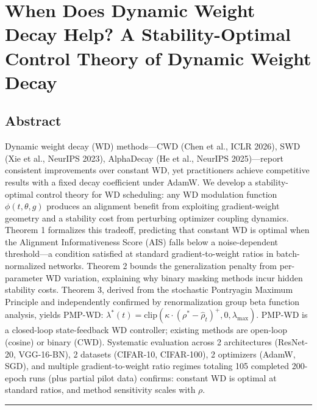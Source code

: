 \documentclass[
]{article}
\author{}
\date{}
\begin{document}
\hypertarget{when-does-dynamic-weight-decay-help-a-stability-optimal-control-theory-of-dynamic-weight-decay}{%
\section{When Does Dynamic Weight Decay Help? A Stability-Optimal
Control Theory of Dynamic Weight
Decay}\label{when-does-dynamic-weight-decay-help-a-stability-optimal-control-theory-of-dynamic-weight-decay}}

\hypertarget{abstract}{%
\subsection{Abstract}\label{abstract}}

Dynamic weight decay (WD) methods---CWD (Chen et al., ICLR 2026), SWD
(Xie et al., NeurIPS 2023), AlphaDecay (He et al., NeurIPS
2025)---report consistent improvements over constant WD, yet
practitioners achieve competitive results with a fixed decay coefficient
under AdamW. We develop a stability-optimal control theory for WD
scheduling: any WD modulation function \(\phi(t, \theta, g)\) produces
an alignment benefit from exploiting gradient-weight geometry and a
stability cost from perturbing optimizer coupling dynamics. Theorem 1
formalizes this tradeoff, predicting that constant WD is optimal when
the Alignment Informativeness Score (AIS) falls below a noise-dependent
threshold---a condition satisfied at standard gradient-to-weight ratios
in batch-normalized networks. Theorem 2 bounds the generalization
penalty from per-parameter WD variation, explaining why binary masking
methods incur hidden stability costs. Theorem 3, derived from the
stochastic Pontryagin Maximum Principle and independently confirmed by
renormalization group beta function analysis, yields PMP-WD:
\(\lambda^*(t) = \text{clip}(\kappa \cdot (\rho^* - \hat{\rho}_t)^+, 0, \lambda_{\max})\).
PMP-WD is a closed-loop state-feedback WD controller; existing methods
are open-loop (cosine) or binary (CWD). Systematic evaluation across 2
architectures (ResNet-20, VGG-16-BN), 2 datasets (CIFAR-10, CIFAR-100),
2 optimizers (AdamW, SGD), and multiple gradient-to-weight ratio regimes
totaling 105 completed 200-epoch runs (plus partial pilot data)
confirms: constant WD is optimal at standard ratios, and method
sensitivity scales with \(\rho\).

\begin{center}\rule{0.5\linewidth}{0.5pt}\end{center}
\end{document}
